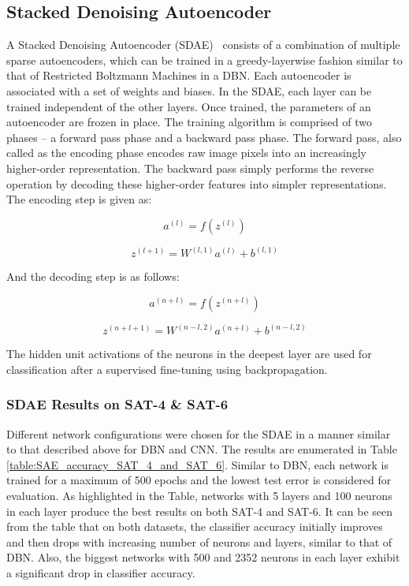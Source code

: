 \documentclass[11pt,a4paper]{article}
\begin{document}
\subsection{Stacked Denoising Autoencoder}
A Stacked Denoising Autoencoder (SDAE)~\cite{Vincent:2010} consists of a combination of multiple sparse autoencoders, which can be trained in a greedy-layerwise fashion similar to that of Restricted Boltzmann Machines in a DBN. Each autoencoder is associated with a set of weights and biases. In the SDAE, each layer can be trained independent of the other layers. Once trained, the parameters of an autoencoder are frozen in place. The training algorithm is comprised of two phases -- a forward pass phase and a backward pass phase. The forward pass, also called as the encoding phase encodes raw image pixels into an increasingly higher-order representation. The backward pass simply performs the reverse operation by decoding these higher-order features into simpler representations. 
The encoding step is given as:

\begin{equation}
a^{(l)} = f(z^{(l)})
\end{equation}

\begin{equation}
z^{(l+1)}= W^{(l,1)} a^{(l)}+ b^{(l,1)}
\end{equation}

And the decoding step is as follows:

\begin{equation}
a^{(n+l)} = f(z^{(n+l)})
\end{equation}

\begin{equation}
z^{(n+l+1)}= W^{(n-l,2)} a^{(n+l)}+ b^{(n-l,2)}
\end{equation}

The hidden unit activations of the neurons in the deepest layer are used for classification after a supervised fine-tuning using backpropagation.

\subsubsection{SDAE Results on SAT-4 \& SAT-6}
Different network configurations were chosen for the SDAE in a manner similar to that described above for DBN and CNN. The results are enumerated in Table \ref{table:SAE_accuracy_SAT_4_and_SAT_6}. Similar to DBN, each network is trained for a maximum of 500 epochs and the lowest test error is considered for evaluation. As highlighted in the Table, networks with 5 layers and 100 neurons in each layer produce the best results on both SAT-4 and SAT-6. It can be seen from the table that on both datasets, the classifier accuracy initially improves and then drops with increasing number of neurons and layers, similar to that of DBN. Also, the biggest networks with 500 and 2352 neurons in each layer exhibit a significant drop in classifier accuracy.  
\end{document}
